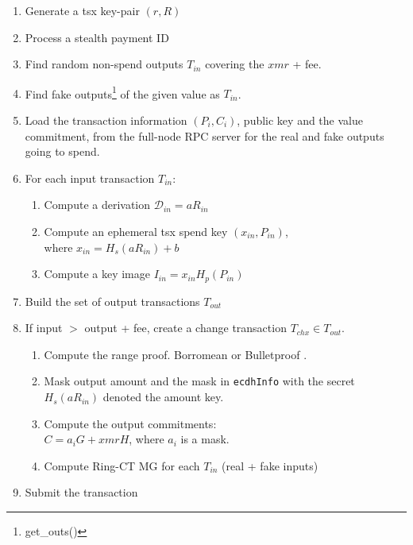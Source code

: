 \documentclass[]{article}
\begin{document}
\begin{enumerate}
	\item Generate a tsx key-pair $(r, R)$
	\item Process a stealth payment ID
	\item Find random non-spend outputs $T_{in}$ covering the $xmr$ + fee.
	\item Find fake outputs\footnote{get\_outs()} of the given value as $T_{in}$.
	\item Load the transaction information $(P_i, C_i)$, public key and the value commitment, from the full-node RPC server for the real and fake outputs going to spend.
	\item For each input transaction $T_{in}$:
	\begin{enumerate}
		\item Compute a derivation $\mathcal{D}_{in} = aR_{in}$
		\item Compute an ephemeral tsx spend key $(x_{in}, P_{in})$, \\where $x_{in} = H_s(aR_{in}) + b$
		\item Compute a key image $I_{in} = x_{in}H_p(P_{in})$
	\end{enumerate}
	\item Build the set of output transactions $T_{out}$
	\item If input $>$ output + fee, create a change transaction $T_{chx} \in T_{out}$. 
	\begin{enumerate}
		\item Compute the range proof. Borromean or Bulletproof \cite{monero_1098, Bnz2017BulletproofsSP}.
		\item Mask output amount and the mask in \verb|ecdhInfo| with the secret $H_s(aR_{in})$ denoted the amount key.
		\item Compute the output commitments:\\ 
		$C = a_iG + xmrH$, where $a_i$ is a mask.
		\item Compute Ring-CT MG for each $T_{in}$ (real + fake inputs)
	\end{enumerate}
	\item Submit the transaction
\end{enumerate}
\end{document}
